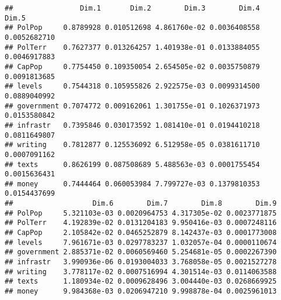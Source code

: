 \documentclass[
]{article}
\newenvironment{Shaded}{\begin{snugshade}}{\end{snugshade}}
\newcommand{\CommentTok}[1]{\textcolor[rgb]{0.56,0.35,0.01}{\textit{#1}}}
\newcommand{\DecValTok}[1]{\textcolor[rgb]{0.00,0.00,0.81}{#1}}
\newcommand{\FloatTok}[1]{\textcolor[rgb]{0.00,0.00,0.81}{#1}}
\newcommand{\KeywordTok}[1]{\textcolor[rgb]{0.13,0.29,0.53}{\textbf{#1}}}
\newcommand{\NormalTok}[1]{#1}
\newcommand{\OperatorTok}[1]{\textcolor[rgb]{0.81,0.36,0.00}{\textbf{#1}}}
\newcommand{\StringTok}[1]{\textcolor[rgb]{0.31,0.60,0.02}{#1}}
\begin{document}
\begin{verbatim}
##                Dim.1       Dim.2        Dim.3        Dim.4        Dim.5
## PolPop     0.8789928 0.010512698 4.861760e-02 0.0036408558 0.0052682710
## PolTerr    0.7627377 0.013264257 1.401938e-01 0.0133884055 0.0046917883
## CapPop     0.7754450 0.109350054 2.654505e-02 0.0035750879 0.0091813685
## levels     0.7544318 0.105955826 2.922575e-03 0.0099314500 0.0889040992
## government 0.7074772 0.009162061 1.301755e-01 0.1026371973 0.0153580842
## infrastr   0.7395846 0.030173592 1.081410e-01 0.0194410218 0.0811649807
## writing    0.7812877 0.125536092 6.512958e-05 0.0381611710 0.0007091162
## texts      0.8626199 0.087508689 5.488563e-03 0.0001755454 0.0015636431
## money      0.7444464 0.060053984 7.799727e-03 0.1379810353 0.0154437699
##                   Dim.6        Dim.7        Dim.8        Dim.9
## PolPop     5.321103e-03 0.0020964753 4.317305e-02 0.0023771875
## PolTerr    4.192839e-02 0.0131204183 9.950416e-03 0.0007248116
## CapPop     2.105842e-02 0.0465252879 8.142437e-03 0.0001773008
## levels     7.961671e-03 0.0297783237 1.032057e-04 0.0000110674
## government 2.885371e-02 0.0060569460 5.254681e-05 0.0002267390
## infrastr   3.990936e-06 0.0193004033 3.768058e-05 0.0021527278
## writing    3.778117e-02 0.0007516994 4.301514e-03 0.0114063588
## texts      1.180934e-02 0.0009628496 3.004440e-03 0.0268669925
## money      9.984368e-03 0.0206947210 9.998878e-04 0.0025961013
\end{verbatim}

\begin{Shaded}
\end{Shaded}
\end{document}
